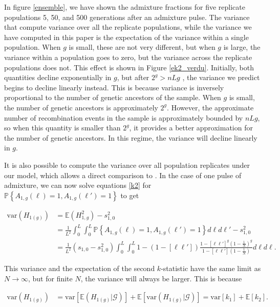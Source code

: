 \documentclass[11pt]{amsart}
\begin{document}
In figure \ref{ensemble}, we have shown the admixture fractions for five replicate populations 5, 50, and 500 generations after an admixture pulse. The variance that \citep{verdu2011general} compute variance over all the replicate populations, while the variance we have computed in this paper is the expectation of the variance within a single population. When $g$ is small, these are not very different, but when $g$ is large, the variance within a population goes to zero, but the variance across the replicate populations does not. This effect is shown in Figure \ref{ek2_verdu}. Initially, both quantities decline exponentially in $g$, but after $2^g > nLg$ 
, the variance we predict begins to decline linearly instead. This is because variance is inversely proportional to the number of genetic ancestors of the sample. When $g$ is small, the number of genetic ancestors is approximately $2^g$. However, the approximate number of recombination events in the sample is approximately bounded by $nLg$, so when this quantity is smaller than $2^g$, it provides a better approximation for the number of genetic ancestors. In this regime, the variance will decline linearly in $g$.

It is also possible to compute the variance over all population replicates under our model, which allows a direct comparison to \citet{verdu2011general}.
In the case of one pulse of admixture, we can now solve equations \ref{k2} for $\mathbb{P}\left\{A_{1,g}(\ell)=1, A_{1,g}(\ell')=1\right\}$ to get

\begin{align}\nonumber
	\text{var}(H_{1(g)})&=\mathbb{E}(H_{1,g}^2)-s_{1,0}^2\\
		&=\frac{1}{L^2}\int_0^L\int_0^L\mathbb{P}\left\{A_{1,g}(\ell)=1, A_{1,g}(\ell')=1\right\} d\ell d\ell'-s_{1,0}^2\nonumber\\
		&=\frac{1}{L^2}\left(s_{1,0}-s_{1,0}^2\right)\int_0^L\int_0^L1-\left(1-[\ell\ell']\right)\frac{1-[\ell\ell']^g\left(1-\frac{1}{N}\right)^g}{1-[\ell\ell']\left(1-\frac{1}{N}\right)} d\ell d\ell.
		\label{var}
\end{align}

This variance and the expectation of the second $k$-statistic have the same limit as $N\rightarrow\infty$, but for finite $N$, the variance will always be larger.
This is because

\begin{align*}
\text{var}(H_{1(g)})&=
	\text{var}\left[\mathbb{E}(H_{1(g)}|\mathcal{G})\right]
	+\mathbb{E}\left[\text{var}(H_{1(g)}|\mathcal{G})\right]=\text{var}[k_1]+\mathbb{E}[k_2].
\end{align*}
\end{document}
